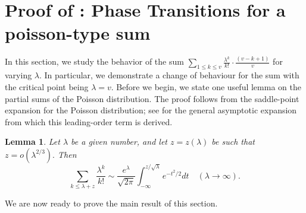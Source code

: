 \documentclass{amsart}
\newtheorem{lemma}[theorem]{Lemma}
\theoremstyle{definition}
\numberwithin{equation}{section}
\begin{document}
	\section{Proof of : Phase Transitions for a poisson-type sum}\label{sec trans range}
	In this section, we study the behavior of the sum $\sum_{1 \leq k \leq v} \frac{\lambda^k}{k!}\cdot\frac{(v-k+1)}{v}$ for varying $\lambda.$ In particular, we demonstrate a change of behaviour for the sum with the critical point being $\lambda = v$. Before we begin, we state one useful lemma on the partial sums of the Poisson distribution. The proof follows from the saddle-point expansion for the Poisson distribution; see \cite[Example 2.4.5]{jensen1995saddlepoint} for the general asymptotic expansion from which this leading-order term is derived.
	\begin{lemma}\label{lem: saddlepoint poisson}
		Let $\lambda$ be a given number, and let $z = z(\lambda)$ be such that $z = o(\lambda^{2/3}).$ Then
		$$\sum_{k \leq \lambda + z} \frac{\lambda^k}{k!} \sim \frac{e^\lambda}{\sqrt{2\pi}} \int_{-\infty}^{z/\sqrt{\lambda}}e^{-t^2/2}dt \quad (\lambda \to \infty).$$
	\end{lemma}
	We are now ready to prove the main result of this section.
\end{document}
